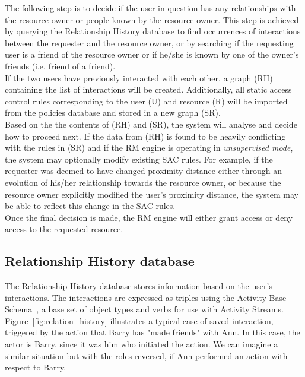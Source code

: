 The following step is to decide if the user in question has any relationships with the resource owner or people known by the resource owner. This step is achieved by querying the Relationship History database to find occurrences of interactions between the requester and the resource owner, or by searching if the requesting user is a friend of the resource owner or if he/she is known by one of the owner's friends (i.e. friend of a friend).\\

If the two users have previously interacted with each other, a graph (RH) containing the list of interactions will be created. Additionally, all static access control rules corresponding to the user (U) and resource (R) will be imported from the policies database and stored in a new graph (SR).\\

Based on the the contents of (RH) and (SR), the system will analyse and decide how to proceed next. If the data from (RH) is found to be heavily conflicting with the rules in (SR) and if the RM engine is operating in \textit{unsupervised mode}, the system may optionally modify existing SAC rules. For example, if the requester was deemed to have changed proximity distance either through an evolution of his/her relationship towards the resource owner, or because the resource owner explicitly modified the user's proximity distance, the system may be able to reflect this change in the SAC rules.\\

Once the final decision is made, the RM engine will either grant access or deny access to the requested resource.


\subsection{Relationship History database}
The Relationship History database stores information based on the user's interactions. The interactions are expressed as triples using the  Activity Base Schema~\cite{activityschema2012}, a base set of object types and verbs for use with Activity Streams.\\

Figure~\ref{fig:relation_history} illustrates a typical case of saved interaction, triggered by the action that Barry has "made friends" with Ann. In this case, the actor is Barry, since it was him who initiated the action. We can imagine a similar situation but with the roles reversed, if Ann performed an action with respect to Barry.\\

